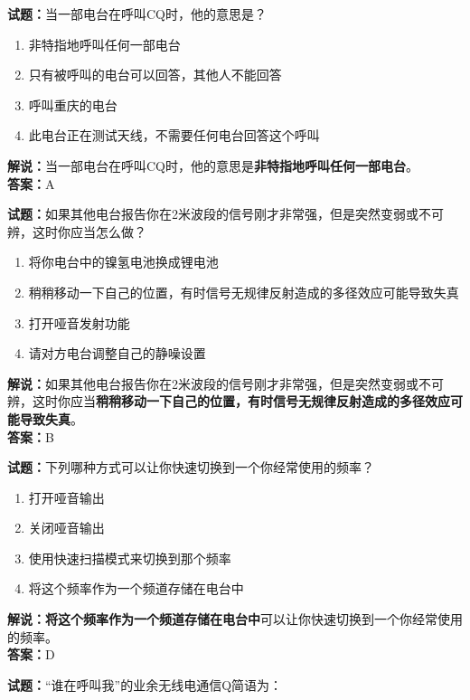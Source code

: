 \documentclass{ctexbook}
\begin{document}
\noindent\textbf{试题：}当一部电台在呼叫CQ时，他的意思是？
\begin{enumerate}[leftmargin=3em]
  \item 非特指地呼叫任何一部电台
  \item 只有被呼叫的电台可以回答，其他人不能回答
  \item 呼叫重庆的电台
  \item 此电台正在测试天线，不需要任何电台回答这个呼叫
\end{enumerate}
\noindent\textbf{解说：}当一部电台在呼叫CQ时，他的意思是\textbf{非特指地呼叫任何一部电台}。\\\noindent\textbf{答案：}A

\vspace{\baselineskip}

\noindent\textbf{试题：}如果其他电台报告你在2米波段的信号刚才非常强，但是突然变弱或不可辨，这时你应当怎么做？
\begin{enumerate}[leftmargin=3em]
  \item 将你电台中的镍氢电池换成锂电池
  \item 稍稍移动一下自己的位置，有时信号无规律反射造成的多径效应可能导致失真
  \item 打开哑音发射功能
  \item 请对方电台调整自己的静噪设置
\end{enumerate}
\noindent\textbf{解说：}如果其他电台报告你在2米波段的信号刚才非常强，但是突然变弱或不可辨，这时你应当\textbf{稍稍移动一下自己的位置，有时信号无规律反射造成的多径效应可能导致失真}。\\\noindent\textbf{答案：}B

\vspace{\baselineskip}

\noindent\textbf{试题：}下列哪种方式可以让你快速切换到一个你经常使用的频率？
\begin{enumerate}[leftmargin=3em]
  \item 打开哑音输出
  \item 关闭哑音输出
  \item 使用快速扫描模式来切换到那个频率
  \item 将这个频率作为一个频道存储在电台中
\end{enumerate}
\noindent\textbf{解说：}\textbf{将这个频率作为一个频道存储在电台中}可以让你快速切换到一个你经常使用的频率。\\\noindent\textbf{答案：}D

\vspace{\baselineskip}

\noindent\textbf{试题：}“谁在呼叫我”的业余无线电通信Q简语为：
\end{document}
